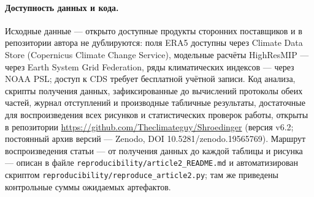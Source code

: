 \documentclass[11pt,a4paper]{article}
\begin{document}
\paragraph{Доступность данных и кода.} Исходные данные --- открыто доступные продукты сторонних поставщиков и в репозитории автора не дублируются: поля ERA5 доступны через Climate Data Store (Copernicus Climate Change Service), модельные расчёты HighResMIP --- через Earth System Grid Federation, ряды климатических индексов --- через NOAA PSL; доступ к CDS требует бесплатной учётной записи. Код анализа, скрипты получения данных, зафиксированные до вычислений протоколы обеих частей, журнал отступлений и производные табличные результаты, достаточные для воспроизведения всех рисунков и статистических проверок работы, открыты в репозитории \url{https://github.com/Theclimateguy/Shroedinger} (версия v6.2; постоянный архив версий --- Zenodo, DOI 10.5281/zenodo.19565769). Маршрут воспроизведения статьи --- от получения данных до каждой таблицы и рисунка --- описан в файле \texttt{reproducibility/article2\_README.md} и автоматизирован скриптом \texttt{reproducibility/reproduce\_article2.py}; там же приведены контрольные суммы ожидаемых артефактов.

\printbibliography[title={Список литературы}]
\end{document}
